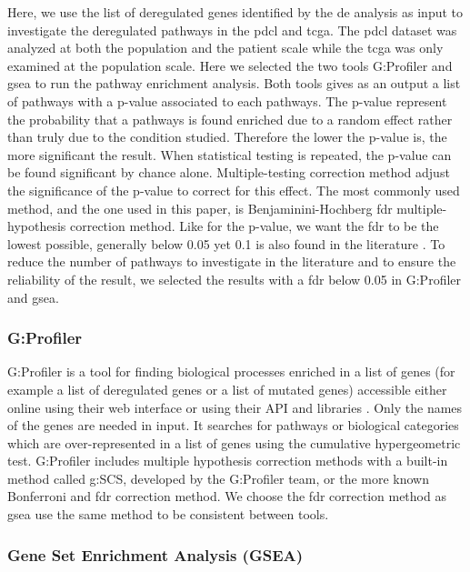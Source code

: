 Here, we use the list of deregulated genes identified by the \acrlong{de} analysis as input to investigate the deregulated pathways in the \acrshort{pdcl} and \acrshort{tcga}.
The \acrlong{pdcl} dataset was analyzed at both the population and the patient scale while the \acrshort{tcga} was only examined at the population scale.
Here we selected the two tools G:Profiler and \acrfull{gsea} to run the pathway enrichment analysis.
Both tools gives as an output a list of pathways with a p-value associated to each pathways.
The p-value represent the probability that a pathways is found enriched due to a random effect rather than truly due to the condition studied.
Therefore the lower the p-value is, the more significant the result.
When statistical testing is repeated, the p-value can be found significant by chance alone.
Multiple-testing correction method adjust the significance of the p-value to correct for this effect.
The most commonly used method, and the one used in this paper, is Benjaminini-Hochberg \acrfull{fdr} multiple-hypothesis correction method.
Like for the p-value, we want the \acrshort{fdr} to be the lowest possible, generally below 0.05 yet 0.1 is also found in the literature \cite*{Reimand2019}.
To reduce the number of pathways to investigate in the literature and to ensure the reliability of the result, we selected the results with a \acrshort{fdr} below 0.05 in G:Profiler and \acrshort{gsea}.

\subsubsection{G:Profiler}
G:Profiler is a tool for finding biological processes enriched in a list of genes (for example a list of deregulated genes or a list of mutated genes) accessible either online using their web interface or using their API and libraries \cite*{Raudvere2019}.
Only the names of the genes are needed in input.
It searches for pathways or biological categories which are over-represented in a list of genes using the cumulative hypergeometric test.
G:Profiler includes multiple hypothesis correction methods with a built-in method called g:SCS, developed by the G:Profiler team, or the more known Bonferroni and \acrshort{fdr} correction method.
We choose the \acrshort{fdr} correction method as \acrshort{gsea} use the same method to be consistent between tools.

\subsubsection{Gene Set Enrichment Analysis (GSEA)}

